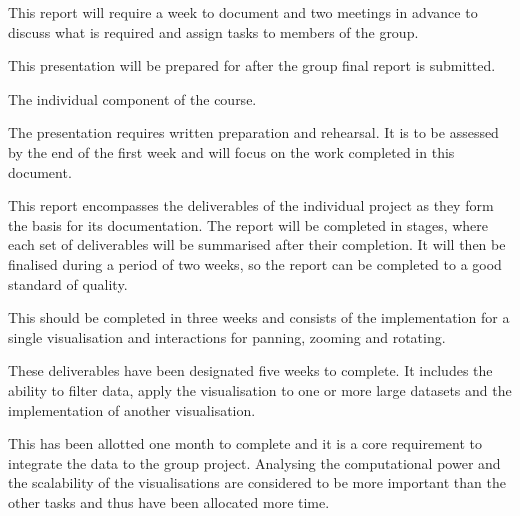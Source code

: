 \documentclass[
	fontsize=11pt
	headlines=2,
	footlines=2,
	parskip=half
]{scrartcl}
\begin{document}
{\begin{description}
\begin{description}[itemsep=-1ex, topsep=0pt, partopsep=0pt]
				\item[Final report:] This report will require a week to document and two meetings in advance to discuss what is required and assign tasks to members of the group.
				\item[Open day presentation:] This presentation will be prepared for after the group final report is submitted.
			\end{description}
			\item[Individual work:] The individual component of the course.
			\begin{description}[itemsep=-1ex, topsep=0pt, partopsep=0pt]
				\item[Presentation:] The presentation requires written preparation and rehearsal. It is to be assessed by the end of the first week and will focus on the work completed in this document.
				\item[Final report:] This report encompasses the deliverables of the individual project as they form the basis for its documentation. The report will be completed in stages, where each set of deliverables will be summarised after their completion. It will then be finalised during a period of two weeks, so the report can be completed to a good standard of quality.
				\begin{description}[itemsep=-1ex, topsep=0pt, partopsep=0pt]
					\item[Basic deliverables:] This should be completed in three weeks and consists of the implementation for a single visualisation and interactions for panning, zooming and rotating.
					\item[Intermediate deliverables:] These deliverables have been designated five weeks to complete. It includes the ability to filter data, apply the visualisation to one or more large datasets and the implementation of another visualisation.
					\item[Advanced deliverables:] This has been allotted one month to complete and it is a core requirement to integrate the data to the group project. Analysing the computational power and the scalability of the visualisations are considered to be more important than the other tasks and thus have been allocated more time.
				\end{description}
			\end{description}
		\end{description}
		
	}
	
	\newpage
	
\end{document}
